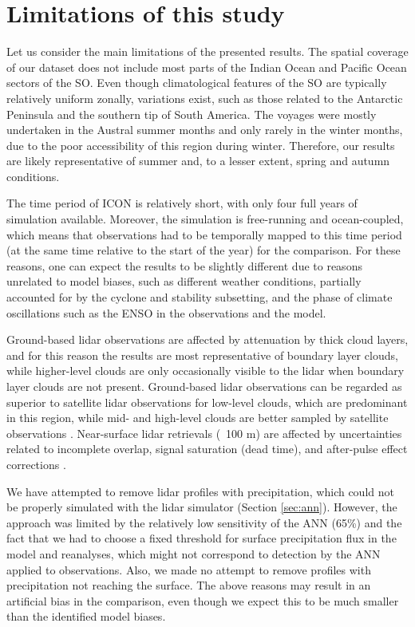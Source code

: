 \documentclass[draft]{agujournal2019}
\begin{document}
\section{Limitations of this study}

Let us consider the main limitations of the presented results. The spatial coverage of our dataset does not include most parts of the Indian Ocean and Pacific Ocean sectors of the SO. Even though climatological features of the SO are typically relatively uniform zonally, variations exist, such as those related to the Antarctic Peninsula and the southern tip of South America. The voyages were mostly undertaken in the Austral summer months and only rarely in the winter months, due to the poor accessibility of this region during winter. Therefore, our results are likely representative of summer and, to a lesser extent, spring and autumn conditions.

The time period of ICON is relatively short, with only four full years of simulation available. Moreover, the simulation is free-running and ocean-coupled, which means that observations had to be temporally mapped to this time period (at the same time relative to the start of the year) for the comparison. For these reasons, one can expect the results to be slightly different due to reasons unrelated to model biases, such as different weather conditions, partially accounted for by the cyclone and stability subsetting, and the phase of climate oscillations such as the ENSO in the observations and the model.

Ground-based lidar observations are affected by attenuation by thick cloud layers, and for this reason the results are most representative of boundary layer clouds, while higher-level clouds are only occasionally visible to the lidar when boundary layer clouds are not present. Ground-based lidar observations can be regarded as superior to satellite lidar observations for low-level clouds, which are predominant in this region, while mid- and high-level clouds are better sampled by satellite observations \cite{mcerlich2021}. Near-surface lidar retrievals (~100 m) are affected by uncertainties related to incomplete overlap, signal saturation (dead time), and after-pulse effect corrections \cite{kuma2021}.

We have attempted to remove lidar profiles with precipitation, which could not be properly simulated with the lidar simulator (Section \ref{sec:ann}). However, the approach was limited by the relatively low sensitivity of the ANN (65\%) and the fact that we had to choose a fixed threshold for surface precipitation flux in the model and reanalyses, which might not correspond to detection by the ANN applied to observations. Also, we made no attempt to remove profiles with precipitation not reaching the surface. The above reasons may result in an artificial bias in the comparison, even though we expect this to be much smaller than the identified model biases.
\end{document}

